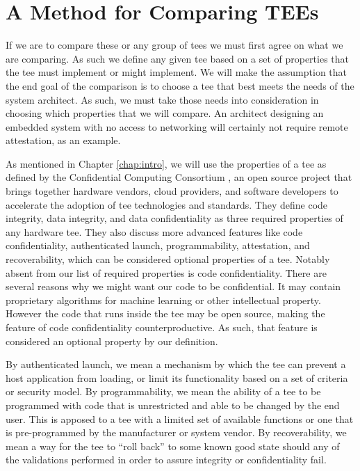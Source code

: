 \section{A Method for Comparing TEEs}
If we are to compare these or any group of \glspl{tee} we must first agree on what we are comparing. As such we define any given \gls{tee} based on a set of properties that the \gls{tee} must implement or might implement. We will make the assumption that the end goal of the comparison is to choose a \gls{tee} that best meets the needs of the system architect. As such, we must take those needs into consideration in choosing which properties that we will compare. An architect designing an embedded system with no access to networking will certainly not require remote \gls{attestation}, as an example. 

As mentioned in Chapter \ref{chap:intro}, we will use the properties of a \gls{tee} as defined by the Confidential Computing Consortium \cite{cccTAC}, an open source project that brings together hardware vendors, cloud providers, and software developers to accelerate the adoption of \gls{tee} technologies and standards. They define code integrity, data integrity, and data confidentiality as three required properties of any hardware \gls{tee}. They also discuss more advanced features like code confidentiality, authenticated launch, programmability, \gls{attestation}, and recoverability, which can be considered optional properties of a \gls{tee}. Notably absent from our list of required properties is code confidentiality. There are several reasons why we might want our code to be confidential. It may contain proprietary algorithms for machine learning or other intellectual property. However the code that runs inside the \gls{tee} may be open source, making the feature of code confidentiality counterproductive. As such, that feature is considered an optional property by our definition.

By authenticated launch, we mean a mechanism by which the \gls{tee} can prevent a host application from loading, or limit its functionality based on a set of criteria or security model. By programmability, we mean the ability of a \gls{tee} to be programmed with code that is unrestricted and able to be changed by the end user. This is apposed to a \gls{tee} with a limited set of available functions or one that is pre-programmed by the manufacturer or system vendor. By recoverability, we mean a way for the \gls{tee} to ``roll back'' to some known good state should any of the validations performed in order to assure integrity or confidentiality fail.

